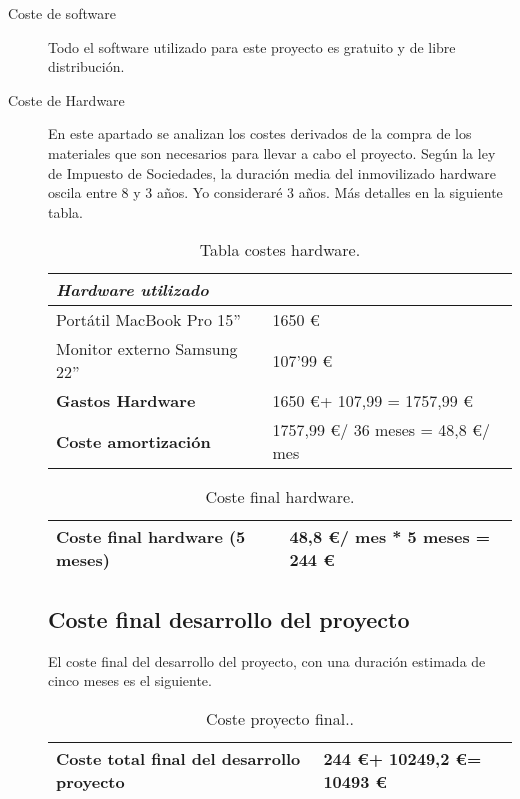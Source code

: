 \begin{description}
	\item[Coste de software] Todo el software utilizado para este proyecto es gratuito y de libre distribución. 
	
	\item[Coste de Hardware] En este apartado se analizan los costes derivados de la compra de los materiales que son necesarios para llevar a cabo el proyecto. Según la ley de Impuesto de Sociedades, la duración media del inmovilizado  hardware oscila entre 8 y 3 a\~nos. Yo consideraré 3 años. Más detalles en la siguiente tabla.  
	
\begin{table}[htbp]
\begin{center}
\begin{tabular}{|l|l|}
\hline
 \emph{Hardware utilizado}&  \\
\hline \hline
 Portátil MacBook Pro 15'' & 1650 \euro  \\ \hline
Monitor externo Samsung 22'' &    107'99 \euro\\ \hline
\textbf{Gastos Hardware}  &   1650 \euro + 107,99  =  1757,99 \euro \\ \hline
\textbf{Coste amortización}  &  1757,99 \euro  / 36 meses = 48,8 \euro / mes  \\ \hline
\end{tabular}
\caption{Tabla costes hardware.}
\label{tabla:hardware}
\end{center}
\end{table}

\begin{table}[htbp]
\begin{center}
\begin{tabular}{|l|l|}
\hline
\textbf{Coste final hardware} (5 meses)  &  48,8 \euro / mes  *  5 meses = 244 \euro   \\ \hline
\end{tabular}
\caption{Coste final hardware.}
\label{tabla:costefinalhardware}
\end{center}
\end{table}


\subsection{Coste final desarrollo del proyecto}\label{coste-final}

El coste final del desarrollo del proyecto, con una duración estimada de cinco meses es el siguiente.  

\begin{table}[htb]
\begin{center}
\begin{tabular}{|l|l|}
\hline
\textbf{Coste total final del desarrollo proyecto}  &  244 \euro +  10249,2 \euro = 10493 \euro   \\ \hline
\end{tabular}
\caption{Coste proyecto final..}
\label{tabla:costefinal}
\end{center}
\end{table}

\end{description}

